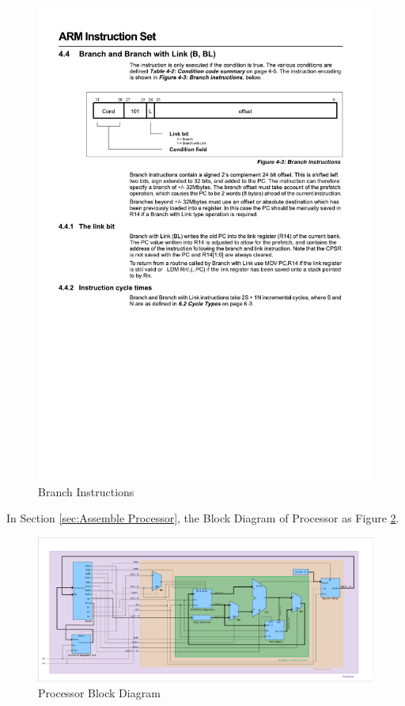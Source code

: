 \documentclass[12pt,a4paper]{article}
\begin{document}
\begin{figure}[htp]
  \centering
  \includegraphics[width=1\textwidth]{picture/Branch instructions.pdf}
  \caption{Branch Instructions}     
  \label{fig:Branch instructions}
\end{figure}

In Section \ref{sec:Assemble Processor}, the Block Diagram of Processor as Figure \ref{fig:PU}.

\begin{figure}[htp]
  \centering
  \includegraphics[width=1.5\textwidth, angle=270]{picture/PU.pdf}
  \caption{Processor Block Diagram}     
  \label{fig:PU}
\end{figure}
\end{document}
